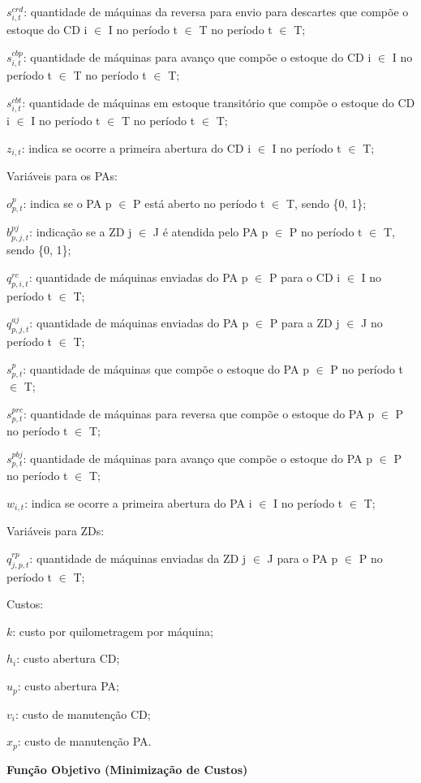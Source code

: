 $s^{crd}_{i,t}$: quantidade de máquinas da reversa para envio para descartes que compõe o estoque do CD i $\in$ I no período t $\in$ T no período t $\in$ T;

$s^{cbp}_{i,t}$: quantidade de máquinas para avanço que compõe o estoque do CD i $\in$ I no período t $\in$ T no período t $\in$ T;

$s^{cbt}_{i,t}$: quantidade de máquinas em estoque transitório que compõe o estoque do CD i $\in$ I no período t $\in$ T no período t $\in$ T;

$z_{i,t}$: indica se ocorre a primeira abertura do CD i $\in$ I no período t $\in$ T;

Variáveis para os PAs:

$o^{p}_{p,t}$: indica se o PA p $\in$ P está aberto no período t $\in$ T, sendo \{0, 1\};

$b^{pj}_{p,j,t}$: indicação se a ZD j $\in$ J é atendida pelo PA p $\in$ P no período t $\in$ T, sendo \{0, 1\};

$q^{rc}_{p,i,t}$: quantidade de máquinas enviadas do PA p $\in$ P para o CD i $\in$ I no período t $\in$ T;

$q^{aj}_{p,j,t}$: quantidade de máquinas enviadas do PA p $\in$ P para a ZD j $\in$ J no período t $\in$ T;

$s^{p}_{p,t}$: quantidade de máquinas que compõe o estoque do PA p $\in$ P no período t $\in$ T;

$s^{prc}_{p,t}$: quantidade de máquinas para reversa que compõe o estoque do PA p $\in$ P no período t $\in$ T;

$s^{pbj}_{p,t}$: quantidade de máquinas para avanço que compõe o estoque do PA p $\in$ P no período t $\in$ T;

$w_{i,t}$: indica se ocorre a primeira abertura do PA i $\in$ I no período t $\in$ T;

Variáveis para ZDs:

$q^{rp}_{j,p,t}$: quantidade de máquinas enviadas da ZD j $\in$ J para o PA p $\in$ P no período t $\in$ T;

Custos:

$k$: custo por quilometragem por máquina;

$h_{i}$: custo abertura CD;

$u_{p}$: custo abertura PA;

$v_{i}$: custo de manutenção CD;

$x_{p}$: custo de manutenção PA.


\noindent \textbf{Função Objetivo (Minimização de Custos)}


